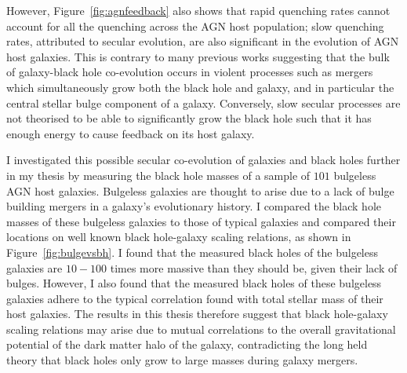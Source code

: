 \documentclass[12pt, usenatbib]{article}
\begin{document}
However, Figure~\ref{fig:agnfeedback} also shows that rapid quenching rates cannot account for all the quenching across the AGN host population; slow quenching rates, attributed to secular evolution, are also significant in the evolution of AGN host galaxies. This is contrary to many previous works suggesting that the bulk of galaxy-black hole co-evolution occurs in violent processes such as mergers which simultaneously grow both the black hole and galaxy, and in particular the central stellar bulge component of a galaxy. Conversely, slow secular processes are not theorised to be able to significantly grow the black hole such that it has enough energy to cause feedback on its host galaxy.

I investigated this possible secular co-evolution of galaxies and black holes further in my thesis by measuring the black hole masses of a sample of $101$ bulgeless AGN host galaxies. Bulgeless galaxies are thought to arise due to a lack of bulge building mergers in a galaxy's evolutionary history. I compared the black hole masses of these bulgeless galaxies to those of typical galaxies and compared their locations on well known black hole-galaxy scaling relations, as shown in Figure~\ref{fig:bulgevsbh}. I found that the measured black holes of the bulgeless galaxies are $10-100$ times more massive than they should be, given their lack of bulges. However, I also found that the measured black holes of these bulgeless galaxies adhere to the typical correlation found with total stellar mass of their host galaxies. The results in this thesis therefore suggest that black hole-galaxy scaling relations may arise due to mutual correlations to the overall gravitational potential of the dark matter halo of the galaxy, contradicting the long held theory that black holes only grow to large masses during galaxy mergers. 
\end{document}
